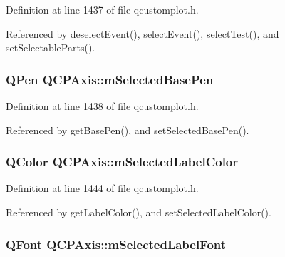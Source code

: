 Definition at line 1437 of file qcustomplot.\+h.



Referenced by deselect\+Event(), select\+Event(), select\+Test(), and set\+Selectable\+Parts().

\hypertarget{class_q_c_p_axis_a80baa4e3c16f9b6edf3eccacd2a50fde}{}
\subsubsection[{m\+Selected\+Base\+Pen}]{\setlength{\rightskip}{0pt plus 5cm}Q\+Pen Q\+C\+P\+Axis\+::m\+Selected\+Base\+Pen\hspace{0.3cm}{\ttfamily [protected]}}\label{class_q_c_p_axis_a80baa4e3c16f9b6edf3eccacd2a50fde}


Definition at line 1438 of file qcustomplot.\+h.



Referenced by get\+Base\+Pen(), and set\+Selected\+Base\+Pen().

\hypertarget{class_q_c_p_axis_a94f57de3ba024471ca206d83cf2258dd}{}
\subsubsection[{m\+Selected\+Label\+Color}]{\setlength{\rightskip}{0pt plus 5cm}Q\+Color Q\+C\+P\+Axis\+::m\+Selected\+Label\+Color\hspace{0.3cm}{\ttfamily [protected]}}\label{class_q_c_p_axis_a94f57de3ba024471ca206d83cf2258dd}


Definition at line 1444 of file qcustomplot.\+h.



Referenced by get\+Label\+Color(), and set\+Selected\+Label\+Color().

\hypertarget{class_q_c_p_axis_ae48fe3489afadc0b3cd003233e2bf19f}{}
\subsubsection[{m\+Selected\+Label\+Font}]{\setlength{\rightskip}{0pt plus 5cm}Q\+Font Q\+C\+P\+Axis\+::m\+Selected\+Label\+Font\hspace{0.3cm}{\ttfamily [protected]}}\label{class_q_c_p_axis_ae48fe3489afadc0b3cd003233e2bf19f}


